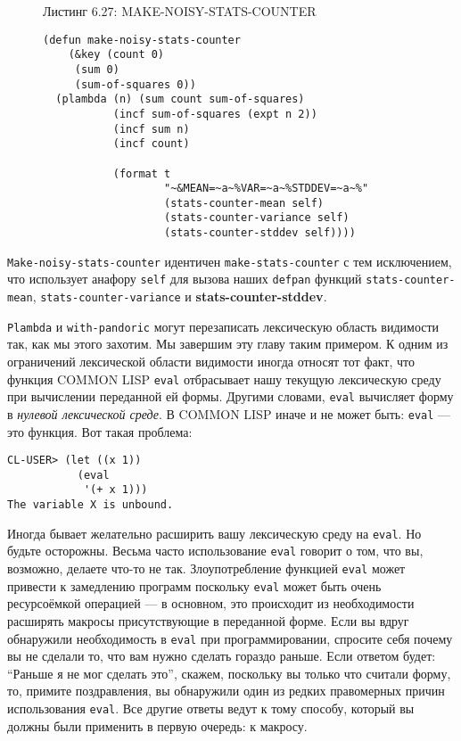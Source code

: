 \begin{figure}Листинг 6.27: MAKE-NOISY-STATS-COUNTER\label{listing_6.27}
\listbegin
\begin{verbatim}
(defun make-noisy-stats-counter
    (&key (count 0)
     (sum 0)
     (sum-of-squares 0))
  (plambda (n) (sum count sum-of-squares)
           (incf sum-of-squares (expt n 2))
           (incf sum n)
           (incf count)
           
           (format t
                   "~&MEAN=~a~%VAR=~a~%STDDEV=~a~%"
                   (stats-counter-mean self)
                   (stats-counter-variance self)
                   (stats-counter-stddev self))))
\end{verbatim}
\listend
\end{figure}

\verb"Make-noisy-stats-counter" идентичен \verb"make-stats-counter" с тем исключением, что использует анафору \verb"self" для вызова наших \verb"defpan" функций \verb"stats-counter-mean", \verb"stats-counter-variance" и \foreignlanguage{english}{\textbf{stats\--\-coun\-ter\--\-std\-dev}}.

\verb"Plambda" и \verb"with-pandoric" могут перезаписать лексическую область видимости так, как мы этого захотим. Мы завершим эту главу таким примером. К одним из ограничений лексической области видимости иногда относят тот факт, что функция COMMON LISP \verb"eval" отбрасывает нашу текущую лексическую среду при вычислении переданной ей формы. Другими словами, \verb"eval" вычисляет форму в \emph{нулевой лексической среде}. В COMMON LISP иначе и не может быть: \verb"eval" --- это функция. Вот такая проблема:

\begin{verbatim}
CL-USER> (let ((x 1))
           (eval
            '(+ x 1)))
The variable X is unbound.
\end{verbatim}

Иногда бывает желательно расширить вашу лексическую среду на \verb"eval". Но будьте осторожны. Весьма часто использование \verb"eval" говорит о том, что вы, возможно, делаете что-то не так. Злоупотребление функцией \verb"eval" может привести к замедлению программ поскольку \verb"eval" может быть очень ресурсоёмкой операцией --- в основном, это происходит из необходимости расширять макросы присутствующие в переданной форме. Если вы вдруг обнаружили необходимость в \verb"eval" при программировании, спросите себя почему вы не сделали то, что вам нужно сделать гораздо раньше. Если ответом будет: ``Раньше я не мог сделать это'', скажем, поскольку вы только что считали форму, то, примите поздравления, вы обнаружили один из редких правомерных причин использования \verb"eval". Все другие ответы ведут к тому способу, который вы должны были применить в первую очередь: к макросу.

